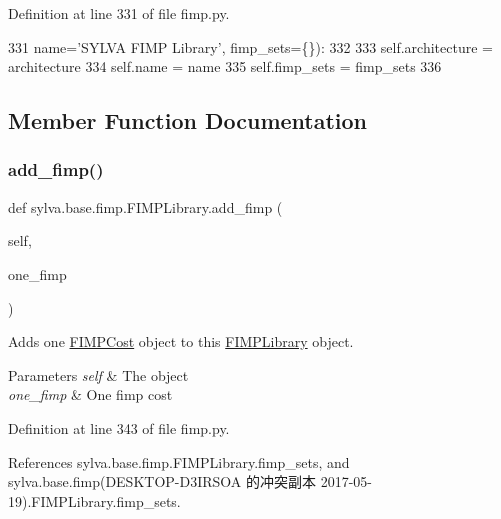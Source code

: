 Definition at line 331 of file fimp.\+py.


\begin{DoxyCode}
331                  name=\textcolor{stringliteral}{'SYLVA FIMP Library'}, fimp\_sets=\{\}):
332 
333         self.architecture = architecture
334         self.name = name
335         self.fimp\_sets = fimp\_sets
336 
\end{DoxyCode}


\subsection{Member Function Documentation}
\mbox{\label{classsylva_1_1base_1_1fimp_1_1_f_i_m_p_library_af156e65fec1988518374cd97ea3f7bdb}} 
\subsubsection{\texorpdfstring{add\+\_\+fimp()}{add\_fimp()}}
{\footnotesize\ttfamily def sylva.\+base.\+fimp.\+F\+I\+M\+P\+Library.\+add\+\_\+fimp (\begin{DoxyParamCaption}\item[{}]{self,  }\item[{}]{one\+\_\+fimp }\end{DoxyParamCaption})}



Adds one \hyperlink{classsylva_1_1base_1_1fimp_1_1_f_i_m_p_cost}{F\+I\+M\+P\+Cost} object to this \hyperlink{classsylva_1_1base_1_1fimp_1_1_f_i_m_p_library}{F\+I\+M\+P\+Library} object. 


\begin{DoxyParams}{Parameters}
{\em self} & The object \\
\hline
{\em one\+\_\+fimp} & One fimp cost \\
\hline
\end{DoxyParams}


Definition at line 343 of file fimp.\+py.



References sylva.\+base.\+fimp.\+F\+I\+M\+P\+Library.\+fimp\+\_\+sets, and sylva.\+base.\+fimp(\+D\+E\+S\+K\+T\+O\+P-\/\+D3\+I\+R\+S\+O\+A 的冲突副本 2017-\/05-\/19).\+F\+I\+M\+P\+Library.\+fimp\+\_\+sets.


